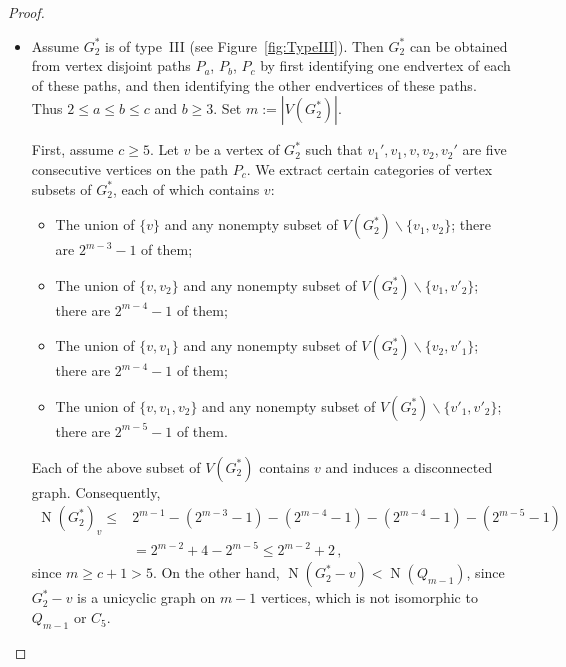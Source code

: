 \documentclass[a4paper,12pt]{amsart}
\theoremstyle{remark}
\DeclareMathOperator{\N}{N}
\begin{document}
\begin{proof}
\begin{itemize}
Recall that $G_2 \in \mathbb{B}_n$ can be constructed from $G_2^*=G_0^*$ by attaching (possibly none) a star $S_r$ rooted at only one vertex, say $v$ of $G_2^*$. In view of Lemma~\ref{Form:RnBn}, 
\begin{align*}
\N(R_6)=39 > 37\,, \quad \N(R_7)=72 > 61\,.
\end{align*} 
In this case where $G_2^*$ is one of the graph shown in Figure~\ref{fig:H4p4}, we `replace' $G_2^*$ directly with $R_{|V(G_2^*)|}$ in $G_2$ to obtain the graph $R_n$. Therefore, Lemma~\ref{Lem:identify} combined with
\begin{align*}
\N(R_{|V(G_2^*)|}) > \N(G^*_2) \quad \text{and} \quad \N(G_2) \geq \N(G_1) \geq \N(G_0)
\end{align*}
give us $\N(R_n) > \N(G_2) \geq \N(G_1) \geq \N(G_0)$, and we are done.

\medskip
\item Assume $G_2^*$ is of type~III (see Figure~\ref{fig:TypeIII}). Then $G_2^*$ can be obtained from vertex disjoint paths $P_a$, $P_b$, $P_c$ by first identifying one endvertex of each of these paths, and then identifying the other endvertices of these paths. Thus $2\leq a\leq b \leq c$ and $b\geq 3$. Set $m:=|V(G^*_2)|$.

First, assume $c\geq 5$. Let $v$ be a vertex of $G_2^*$ such that $v_1', v_1, v, v_2, v_2'$ are five consecutive vertices on the path $P_c$. We extract certain categories of vertex subsets of $G_2^*$, each of which contains $v$:
\begin{itemize}
\item The union of $\{v\}$ and any nonempty subset of $V(G_2^*)\backslash \{v_1,v_2\}$; there are $2^{m-3}-1$ of them;
\item The union of $\{v,v_2\}$ and any nonempty subset of $V(G_2^*)\backslash \{v_1,v'_2\}$; there are $2^{m-4}-1$ of them;
\item The union of $\{v,v_1\}$ and any nonempty subset of $V(G_2^*)\backslash \{v_2,v'_1\}$; there are $2^{m-4}-1$ of them;
\item The union of $\{v,v_1,v_2\}$ and any nonempty subset of $V(G_2^*)\backslash \{v'_1,v'_2\}$; there are $2^{m-5}-1$ of them.
\end{itemize}
Each of the above subset of $V(G_2^*)$ contains $v$ and induces a disconnected graph. Consequently,
\begin{align*}
\N(G_2^*)_v \leq &2^{m-1} - (2^{m-3}-1) - (2^{m-4}-1) - (2^{m-4}-1) - (2^{m-5}-1)\\
&=2^{m-2}+4-2^{m-5} \leq 2^{m-2} +2\,,
\end{align*}
since $m\geq c+1 >5$. On the other hand, $\N(G_2^* -v) < \N(Q_{m-1})$, since $G_2^* -v$ is a unicyclic graph on $m-1$ vertices, which is not isomorphic to $Q_{m-1}$ or $C_5$.


\end{itemize}
\end{proof}
\end{document}
